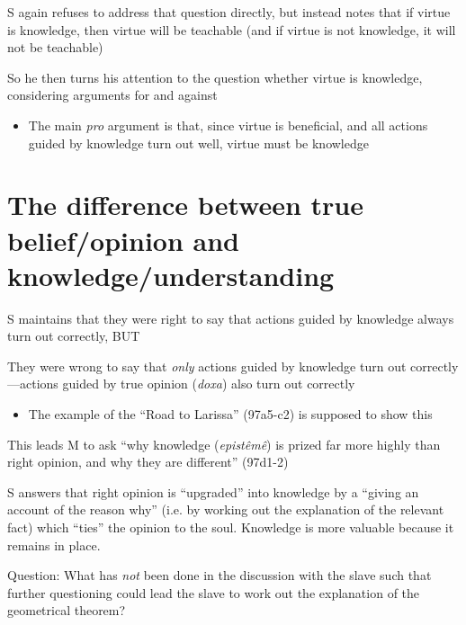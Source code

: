 \documentclass[11pt]{article}
\begin{document}
\noindent S again refuses to address that question directly, but instead notes that if virtue is knowledge, then virtue will be teachable (and if virtue is not knowledge, it will not be teachable)
\vspace*{2mm}

\noindent So he then turns his attention to the question whether virtue is knowledge, considering arguments for and against
\begin{itemize}\item{The main \emph{pro} argument is that, since virtue is beneficial, and all actions guided by knowledge turn out well, virtue must be knowledge}\end{itemize}

\section*{The difference between true belief/opinion and knowledge/understanding}

\noindent S maintains that they were right to say that actions guided by knowledge always turn out correctly, BUT
\vspace*{2mm}

\noindent They were wrong to say that \emph{only} actions guided by knowledge turn out correctly---actions guided by true opinion (\emph{doxa}) also turn out correctly

\begin{itemize}\item{The example of the ``Road to Larissa'' (97a5-c2) is supposed to show this}\end{itemize}

\noindent This leads M to ask ``why knowledge (\emph{epist\^{e}m\^{e}}) is prized far more highly than right opinion, and why they are different'' (97d1-2)
\vspace*{2mm}

\noindent S answers that right opinion is ``upgraded'' into knowledge by a ``giving an account of the reason why'' (i.e. by working out the explanation of the relevant fact) which ``ties'' the opinion to the soul. Knowledge is more valuable because it remains in place.
\vspace*{2mm}

\noindent Question: What has \emph{not} been done in the discussion with the slave such that further questioning could lead the slave to work out the explanation of the geometrical theorem?
\vspace*{2mm}
\end{document}
